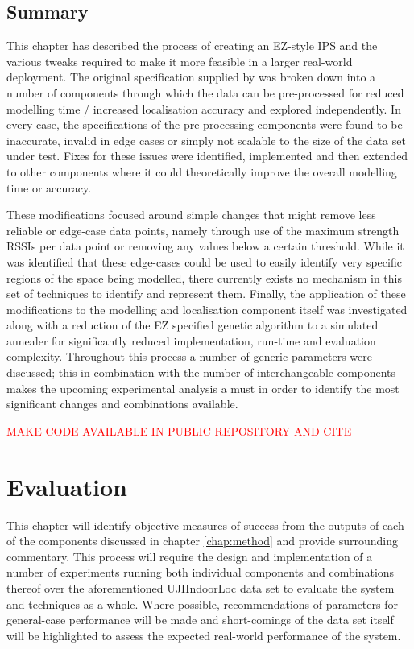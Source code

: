 \documentclass{UoYCSproject}
\begin{document}
		\section{Summary}
		
			This chapter has described the process of creating an EZ-style IPS and the various tweaks required to make it more feasible in a larger real-world deployment. The original specification supplied by \citet{chintalapudi2010indoor} was broken down into a number of components through which the data can be pre-processed for reduced modelling time / increased localisation accuracy and explored independently. In every case, the specifications of the pre-processing components were found to be inaccurate, invalid in edge cases or simply not scalable to the size of the data set under test. Fixes for these issues were identified, implemented and then extended to other components where it could theoretically improve the overall modelling time or accuracy. 
            
            These modifications focused around simple changes that might remove less reliable or edge-case data points, namely through use of the maximum strength RSSIs per data point or removing any values below a certain threshold. While it was identified that these edge-cases could be used to easily identify very specific regions of the space being modelled, there currently exists no mechanism in this set of techniques to identify and represent them. Finally, the application of these modifications to the modelling and localisation component itself was investigated along with a reduction of the EZ specified genetic algorithm to a simulated annealer for significantly reduced implementation, run-time and evaluation complexity. Throughout this process a number of generic parameters were discussed; this in combination with the number of interchangeable components makes the upcoming experimental analysis a must in order to identify the most significant changes and combinations available.
            
            \textcolor{red}{MAKE CODE AVAILABLE IN PUBLIC REPOSITORY AND CITE}
        
	\chapter{Evaluation}
    \label{chap:eval}
    
        This chapter will identify objective measures of success from the outputs of each of the components discussed in chapter \ref{chap:method} and provide surrounding commentary. This process will require the design and implementation of a number of experiments running both individual components and combinations thereof over the aforementioned UJIIndoorLoc data set \cite{torres2014ujiindoorloc} to evaluate the system and techniques as a whole. Where possible, recommendations of parameters for general-case performance will be made and short-comings of the data set itself will be highlighted to assess the expected real-world performance of the system.
    
\end{document}
